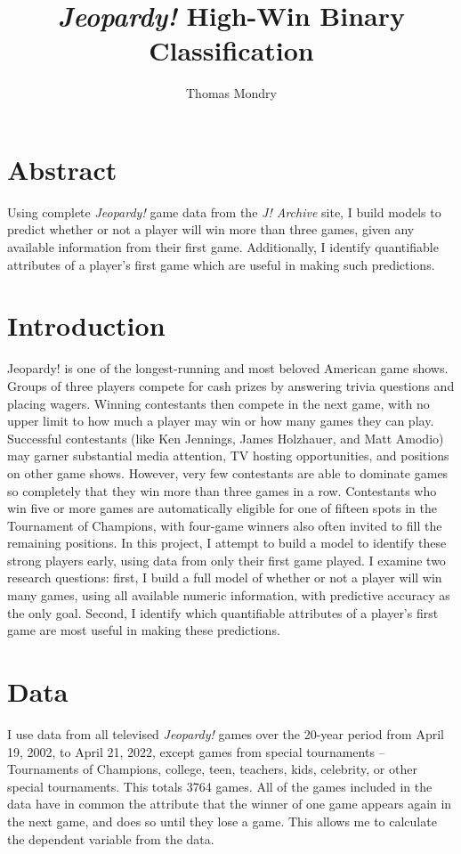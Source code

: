 \documentclass{article}
\title{\textit{Jeopardy!} High-Win Binary Classification}
\author{Thomas Mondry}
\begin{document}
	\maketitle
	
	\section{Abstract}
	
	Using complete \textit{Jeopardy!} game data from the \textit{J! Archive} site, I build models to predict whether or not a player will win more than three games, given any available information from their first game. Additionally, I identify quantifiable attributes of a player's first game which are useful in making such predictions.
	
	\section{Introduction}
	
	Jeopardy! is one of the longest-running and most beloved American game shows. Groups of three players compete for cash prizes by answering trivia questions and placing wagers. Winning contestants then compete in the next game, with no upper limit to how much a player may win or how many games they can play. Successful contestants (like Ken Jennings, James Holzhauer, and Matt Amodio) may garner substantial media attention, TV hosting opportunities, and positions on other game	shows. However, very few contestants are able to dominate games so completely that they win more than three games in a row. Contestants who win five or more games are automatically eligible for one of 	fifteen spots in the Tournament of Champions, with four-game winners also often invited to fill the remaining positions. In this project, I attempt to build a model to identify these strong players early, using data from only their first game played. I examine two research questions: first, I build a full model of whether or not a player will win many games, using all available numeric information, with predictive accuracy as the only goal. Second, I identify which quantifiable attributes of a player's first game are most useful in making these predictions.
	
	\section{Data}
	
	I use data from all televised \textit{Jeopardy!} games over the 20-year period from April 19, 2002, to April 21, 2022, except games from special tournaments -- Tournaments of Champions, college, teen, teachers, kids, celebrity, or other special tournaments. This totals 3764 games. All of the games included in the data have in common the attribute that the winner of one game appears again in the next game, and does so until they lose a game. This allows me to calculate the dependent variable from the data.
	
\end{document}
